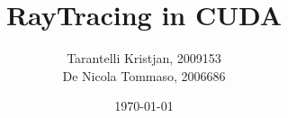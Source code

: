 \documentclass[12pt,a4paper,oneside]{article}
\title{
RayTracing in CUDA
}	                                    %
\author{
Tarantelli Kristjan, 2009153 \\
De Nicola Tommaso, 2006686
}				                %
\date{\today}									    %
\theoremstyle{definition}
\begin{document}

\newpage
\tableofcontents{}
\newpage

\clearpage

\clearpage

\clearpage

\clearpage

{\RaggedRight
}
\nocite{*}  %
\end{document}
